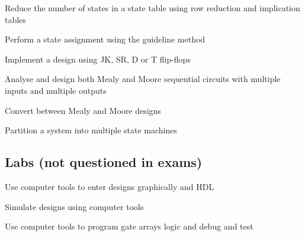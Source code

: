 \begin{todolist}
  \item Reduce the number of states in a state table using row reduction and implication tables
  \item Perform a state assignment using the guideline method
  \item Implement a design using JK, SR, D or T flip-flops
  \item Analyse and design both Mealy and Moore sequential circuits with multiple inputs and multiple outputs
  \item Convert between Mealy and Moore designs
  \item Partition a system into multiple state machines
\end{todolist}

\subsection{Labs (not questioned in exams)}
\begin{todolist}
  \item Use computer tools to enter designs graphically and HDL
  \item Simulate designs using computer tools
  \item Use computer tools to program gate arrays logic and debug and test
\end{todolist}

\newpage
